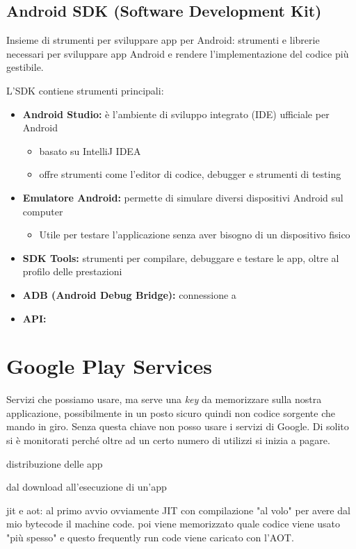 \subsection{Android SDK (Software Development Kit)}
\par Insieme di strumenti per sviluppare app per Android: strumenti e librerie necessari per sviluppare app Android e rendere l'implementazione del codice più gestibile.
\par L'SDK contiene strumenti principali:
\begin{itemize}
    \item \textbf{Android Studio:} è l'ambiente di sviluppo integrato (IDE) ufficiale per Android
    \begin{itemize}
        \item basato su IntelliJ IDEA
        \item offre strumenti come l'editor di codice, debugger e strumenti di testing
    \end{itemize}
    \item \textbf{Emulatore Android:} permette di simulare diversi dispositivi Android sul computer
    \begin{itemize}
        \item Utile per testare l'applicazione senza aver bisogno di un dispositivo fisico
    \end{itemize}
    \item \textbf{SDK Tools:} strumenti per compilare, debuggare e testare le app, oltre al profilo delle prestazioni
    \item \textbf{ADB (Android Debug Bridge):} connessione a
    \item \textbf{API:} 
\end{itemize}

\section{Google Play Services}
\par Servizi che possiamo usare, ma serve una \textit{key} da memorizzare sulla nostra applicazione, possibilmente in un posto sicuro quindi non codice sorgente che mando in giro. Senza questa chiave non posso usare i servizi di Google. Di solito si è monitorati perché oltre ad un certo numero di utilizzi si inizia a pagare.

distribuzione delle app

dal download all'esecuzione di un'app

jit e aot: al primo avvio ovviamente JIT con compilazione "al volo" per avere dal mio bytecode il machine code. poi viene memorizzato quale codice viene usato "più spesso" e questo frequently run code viene caricato con l'AOT.

